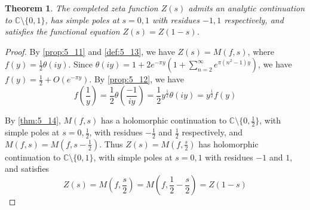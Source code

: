 \documentclass[11pt]{article}
\theoremstyle{definition}
\theoremstyle{plain}
\newtheorem{theorem}[definition]{Theorem}
\theoremstyle{remark}
\newcommand{\CC}{\mathbb{C}}
\begin{document}
\begin{theorem}\label{thm:5_15}
    The completed zeta function $Z(s)$ admits an analytic continuation to $\CC \setminus \{0, 1\}$, has simple poles at $s=0,1$ with residues $-1,1$ respectively, and satisfies the functional equation $Z(s) = Z(1-s)$.
\end{theorem}
\begin{proof}
    By \autoref{prop:5_11} and \autoref{def:5_13}, we have $Z(s) = M(f,s)$, where $f(y) = \frac{1}{2} \theta(iy)$. Since $\theta(i y) = 1 + 2e^{-\pi y} (1 + \sum_{n=2}^\infty e^{\pi (n^2-1) y})$, we have $f(y) = \frac{1}{2} + O(e^{-\pi y})$. By \autoref{prop:5_12}, we have
    \begin{equation*}
        f\left(\frac{1}{y}\right) = \frac{1}{2} \theta\left(\frac{-1}{iy}\right) = \frac{1}{2} y^{\frac{1}{2}} \theta(iy) = y^{\frac{1}{2}} f(y)
    \end{equation*}

    By \autoref{thm:5_14}, $M(f,s)$ has a holomorphic continuation to $\CC \setminus \{0, \frac{1}{2}\}$, with simple poles at $s = 0, \frac{1}{2}$, with residues $-\frac{1}{2}$ and $\frac{1}{2}$ respectively, and $M(f, s) = M(f, s - \frac{1}{2})$. Thus $Z(s) = M(f, \frac{s}{2})$ has holomorphic continuation to $\CC \setminus \{0,1\}$, with simple poles at $s=0,1$ with residues $-1$ and $1$, and satisfies
    \begin{equation*}
        Z(s) = M\left(f, \frac{s}{2}\right) = M\left(f, \frac{1}{2} - \frac{s}{2}\right) = Z(1-s)
    \end{equation*}
\end{proof}
\end{document}
